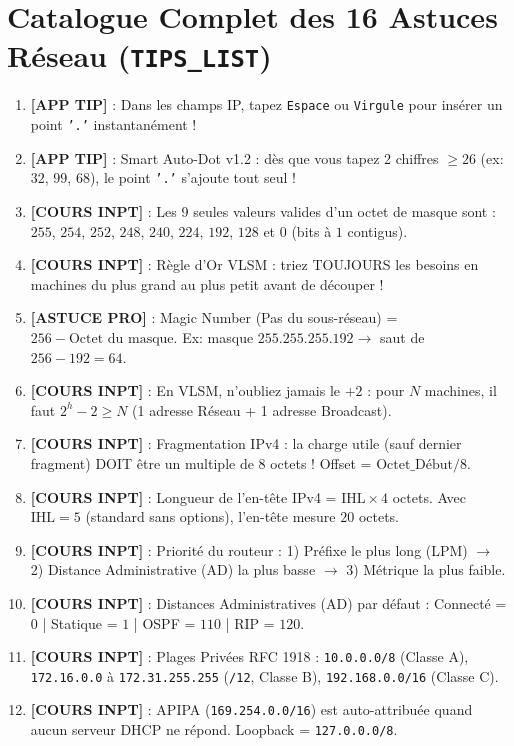 \documentclass[11pt,a4paper]{report}
\begin{document}
\section{Catalogue Complet des 16 Astuces R\'eseau (\texttt{TIPS\_LIST})}
\begin{enumerate}
    \item \textbf{[APP TIP]} : Dans les champs IP, tapez \texttt{Espace} ou \texttt{Virgule} pour ins\'erer un point \texttt{'.'} instantan\'ement !
    \item \textbf{[APP TIP]} : Smart Auto-Dot v1.2 : d\`es que vous tapez 2 chiffres $\ge 26$ (ex: $32$, $99$, $68$), le point \texttt{'.'} s'ajoute tout seul !
    \item \textbf{[COURS INPT]} : Les 9 seules valeurs valides d'un octet de masque sont : $255$, $254$, $252$, $248$, $240$, $224$, $192$, $128$ et $0$ (bits \`a $1$ contigus).
    \item \textbf{[COURS INPT]} : R\`egle d'Or VLSM : triez TOUJOURS les besoins en machines du plus grand au plus petit avant de d\'ecouper !
    \item \textbf{[ASTUCE PRO]} : Magic Number (Pas du sous-r\'eseau) = $256 - \text{Octet du masque}$. Ex: masque $255.255.255.192 \to$ saut de $256 - 192 = 64$.
    \item \textbf{[COURS INPT]} : En VLSM, n'oubliez jamais le $+2$ : pour $N$ machines, il faut $2^h - 2 \ge N$ (1 adresse R\'eseau + 1 adresse Broadcast).
    \item \textbf{[COURS INPT]} : Fragmentation IPv4 : la charge utile (sauf dernier fragment) DOIT \^etre un multiple de 8 octets ! Offset = $\text{Octet\_D\'ebut} / 8$.
    \item \textbf{[COURS INPT]} : Longueur de l'en-t\^ete IPv4 = $\text{IHL} \times 4$ octets. Avec $\text{IHL} = 5$ (standard sans options), l'en-t\^ete mesure $20$ octets.
    \item \textbf{[COURS INPT]} : Priorit\'e du routeur : 1) Pr\'efixe le plus long (LPM) $\to$ 2) Distance Administrative (AD) la plus basse $\to$ 3) M\'etrique la plus faible.
    \item \textbf{[COURS INPT]} : Distances Administratives (AD) par d\'efaut : Connect\'e = $0$ | Statique = $1$ | OSPF = $110$ | RIP = $120$.
    \item \textbf{[COURS INPT]} : Plages Priv\'ees RFC 1918 : \texttt{10.0.0.0/8} (Classe A), \texttt{172.16.0.0} \`a \texttt{172.31.255.255} (\texttt{/12}, Classe B), \texttt{192.168.0.0/16} (Classe C).
    \item \textbf{[COURS INPT]} : APIPA (\texttt{169.254.0.0/16}) est auto-attribu\'ee quand aucun serveur DHCP ne r\'epond. Loopback = \texttt{127.0.0.0/8}.

\end{enumerate}
\end{document}
